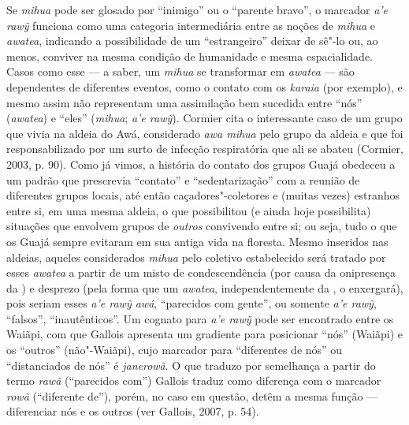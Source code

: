 Se \emph{mihua} pode ser glosado por ``inimigo'' ou o ``parente bravo'', o
marcador \emph{a'e rawỹ} funciona como uma categoria intermediária entre
as noções de \emph{mihua} e \emph{awatea}, indicando a possibilidade de
um ``estrangeiro'' deixar de sê"-lo ou, ao menos, conviver na mesma
condição de humanidade e mesma espacialidade. Casos como esse --- a saber,
um \emph{mihua} se transformar em \emph{awatea} --- são dependentes de
diferentes eventos, como o contato com os \emph{karaia} (por exemplo), e
mesmo assim não representam uma assimilação bem sucedida entre ``nós''
(\emph{awatea}) e ``eles'' (\emph{mihua}; \emph{a'e rawỹ}). Cormier cita o
interessante caso de um grupo que vivia na aldeia do  Awá,
considerado \emph{awa mihua} pelo grupo da aldeia e que foi
responsabilizado por um surto de infecção respiratória que ali se abateu
(Cormier, 2003, p. 90). Como já vimos, a história do contato dos grupos
Guajá obedeceu a um padrão que prescrevia ``contato'' e ``sedentarização''
com a reunião de diferentes grupos locais, até então caçadores"-coletores
e (muitas vezes) estranhos entre si, em uma mesma aldeia, o que
possibilitou (e ainda hoje possibilita) situações que envolvem grupos de
\emph{outros} convivendo entre si; ou seja, tudo o que os Guajá sempre
evitaram em sua antiga vida na floresta. Mesmo inseridos nas aldeias,
aqueles considerados \emph{mihua} pelo coletivo estabelecido será
tratado por esses \emph{awatea} a partir de um misto de condescendência
(por causa da onipresença da ) e desprezo (pela forma que um
\emph{awatea}, independentemente da , o enxergará), pois seriam
esses \emph{a'e rawỹ awá}, ``parecidos com gente'', ou somente \emph{a'e
rawỹ}, ``falsos'', ``inautênticos''. Um cognato para \emph{a'e rawỹ} pode
ser encontrado entre os Waiãpi, com que Gallois apresenta um gradiente
para posicionar ``nós'' (Waiãpi) e os ``outros'' (não"-Waiãpi), cujo
marcador para ``diferentes de nós'' ou ``distanciados de nós'' é
\emph{janerowã}. O que traduzo por semelhança a partir do termo
\emph{rawã} (``parecidos com'') Gallois traduz como diferença com o
marcador \emph{rowã} (``diferente de''), porém, no caso em questão, detêm
a mesma função --- diferenciar nós e os outros (ver Gallois, 2007, p. 54).

